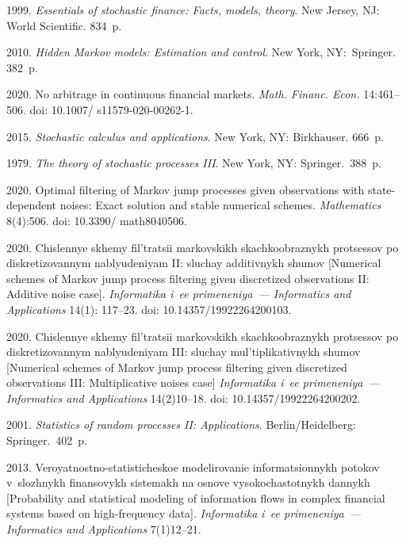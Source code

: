 \begin{multicols}{2}
{{\begin{thebibliography}{99}
 1999. \textit{Essentials of stochastic finance: Facts, models, theory}. New Jersey, NJ: World Scientific. 834~p.



 2010. \textit{Hidden Markov models: Estimation and control}. New York, NY:~Springer. 382~p.

 2020. No arbitrage in continuous financial markets. \textit{Math. Financ. Econ.} 14:461--506.
doi: 10.1007/ s11579-020-00262-1.
 
 2015. \textit{Stochastic calculus and applications}. New York, NY: Birkh$\ddot{\mbox{a}}$user. 666~p.
 
 1979. \textit{The theory of stochastic processes III}. New York, NY: Springer.~388~p.
  
 2020. Optimal filtering of Markov jump processes given observations with state-dependent noises: Exact solution and stable numerical schemes. 
 \textit{Mathematics} 8(4):506.  doi: 10.3390/ math8040506.
 
 2020. Chislennye skhemy fil'tratsii markovskikh skachkoobraznykh protsessov po diskretizovannym nablyudeniyam II: sluchay additivnykh shumov  
[Numerical schemes of Markov jump process filtering given discretized observations II: Additive noise case].
\textit{Informatika i~ee primeneniya~--- Informatics and Applications} 14(1): 117--23. doi: 10.14357/19922264200103.


 2020. Chislennye skhemy fil'tratsii mar\-kov\-skikh skachkoobraznykh protsessov po dis\-kre\-ti\-zo\-van\-nym nablyudeniyam III: 
sluchay mul'tiplikativnykh shu\-mov [Numerical schemes of Markov jump process filtering given discretized observations III: Multiplicative noises case]
\textit{Informatika i~ee primeneniya~--- Informatics and Applications} 14(2)10--18. doi: 10.14357/19922264200202.

 2001. \textit{Statistics of random processes II: Applications}. Berlin/Heidelberg: Springer.~402~p.
 
 2013. 
Veroyatnostno-statisticheskoe modelirovanie informatsionnykh potokov v~slozhnykh finansovykh sistemakh na osnove vysokochastotnykh dannykh
[Probability and statistical modeling of information flows in complex financial systems based on high-frequency data].
\textit{Informatika i~ee primeneniya~--- Informatics and Applications} 7(1)12--21. 
\end{thebibliography}

 }
 }

\end{multicols}

